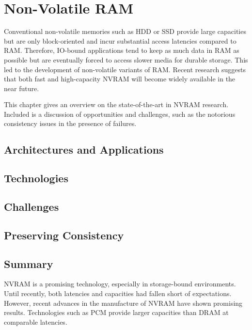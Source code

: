 \chapter{Non-Volatile RAM}
\label{ch:nvram}

Conventional non-volatile memories such as \ac{HDD} or \ac{SSD} provide large
capacities but are only block-oriented and incur substantial access latencies
compared to \ac{RAM}. Therefore, \ac{IO}-bound applications tend to keep as much
data in \ac{RAM} as possible but are eventually forced to access slower media
for durable storage. This led to the development of non-volatile variants of
\ac{RAM}. Recent research suggests that both fast and high-capacity \ac{NVRAM}
will become widely available in the near future.

This chapter gives an overview on the state-of-the-art in \ac{NVRAM} research.
Included is a discussion of opportunities and challenges, such as the notorious
consistency issues in the presence of failures.

\section{Architectures and Applications}
\label{ch:nvram-architectures}


\section{Technologies}
\label{ch:nvram-technologies}


\section{Challenges}
\label{ch:nvram-challenges}


\section{Preserving Consistency}
\label{ch:nvram-consistency}


\section{Summary}
\label{ch:nvram-summary}

\ac{NVRAM} is a promising technology, especially in storage-bound environments.
Until recently, both latencies and capacities had fallen short of expectations.
However, recent advances in the manufacture of \ac{NVRAM} have shown promising
results. Technologies such as \ac{PCM} provide larger capacities than \ac{DRAM}
at comparable latencies.

